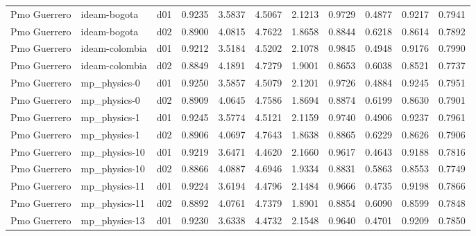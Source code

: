 \begin{longtable}{lllrrrrrrrr}
         Pmo Guerrero  &          ideam-bogota &     d01 &   0.9235 &   3.5837 &   4.5067 &       2.1213 &        0.9729 &       0.4877 &           0.9217 &  0.7941 \\
         Pmo Guerrero  &          ideam-bogota &     d02 &   0.8900 &   4.0815 &   4.7622 &       1.8658 &        0.8844 &       0.6218 &           0.8614 &  0.7892 \\
         Pmo Guerrero  &        ideam-colombia &     d01 &   0.9212 &   3.5184 &   4.5202 &       2.1078 &        0.9845 &       0.4948 &           0.9176 &  0.7990 \\
         Pmo Guerrero  &        ideam-colombia &     d02 &   0.8849 &   4.1891 &   4.7279 &       1.9001 &        0.8653 &       0.6038 &           0.8521 &  0.7737 \\
         Pmo Guerrero  &          mp\_physics-0 &     d01 &   0.9250 &   3.5857 &   4.5079 &       2.1201 &        0.9726 &       0.4884 &           0.9245 &  0.7951 \\
         Pmo Guerrero  &          mp\_physics-0 &     d02 &   0.8909 &   4.0645 &   4.7586 &       1.8694 &        0.8874 &       0.6199 &           0.8630 &  0.7901 \\
         Pmo Guerrero  &          mp\_physics-1 &     d01 &   0.9245 &   3.5774 &   4.5121 &       2.1159 &        0.9740 &       0.4906 &           0.9237 &  0.7961 \\
         Pmo Guerrero  &          mp\_physics-1 &     d02 &   0.8906 &   4.0697 &   4.7643 &       1.8638 &        0.8865 &       0.6229 &           0.8626 &  0.7906 \\
         Pmo Guerrero  &         mp\_physics-10 &     d01 &   0.9219 &   3.6471 &   4.4620 &       2.1660 &        0.9617 &       0.4643 &           0.9188 &  0.7816 \\
         Pmo Guerrero  &         mp\_physics-10 &     d02 &   0.8866 &   4.0887 &   4.6946 &       1.9334 &        0.8831 &       0.5863 &           0.8553 &  0.7749 \\
         Pmo Guerrero  &         mp\_physics-11 &     d01 &   0.9224 &   3.6194 &   4.4796 &       2.1484 &        0.9666 &       0.4735 &           0.9198 &  0.7866 \\
         Pmo Guerrero  &         mp\_physics-11 &     d02 &   0.8892 &   4.0761 &   4.7379 &       1.8901 &        0.8854 &       0.6090 &           0.8599 &  0.7848 \\
         Pmo Guerrero  &         mp\_physics-13 &     d01 &   0.9230 &   3.6338 &   4.4732 &       2.1548 &        0.9640 &       0.4701 &           0.9209 &  0.7850 \\

\end{longtable}

